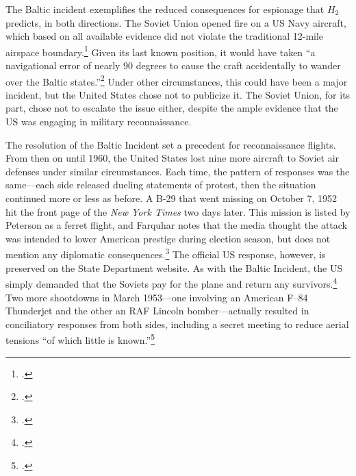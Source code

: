 \documentclass[14pt]{extarticle}
\begin{document}
The Baltic incident exemplifies the reduced consequences for espionage that $H_2$ predicts, in both directions. The Soviet Union opened fire on a US Navy aircraft, which based on all available evidence did not violate the traditional 12-mile airspace boundary.\footcite[p.~7. To be extra specific]{peterson_maybe_1993} Given its last known position, it would have taken ``a navigational error of nearly 90 degrees to cause the craft accidentally to wander over the Baltic states.''\footcite{the_new_york_times_soviet_1950} Under other circumstances, this could have been a major incident, but the United States chose not to publicize it. The Soviet Union, for its part, chose not to escalate the issue either, despite the ample evidence that the US was engaging in military reconnaissance.

The resolution of the Baltic Incident set a precedent for reconnaissance flights. From then on until 1960, the United States lost nine more aircraft to Soviet air defenses under similar circumstances. Each time, the pattern of responses was the same---each side released dueling statements of protest, then the situation continued more or less as before. A B-29 that went missing on October 7, 1952 hit the front page of the \emph{New York Times} two days later. This mission is listed by Peterson as a ferret flight, and Farquhar notes that the media thought the attack was intended to lower American prestige during election season, but does not mention any diplomatic consequences.\footcite[p.~43-44]{farquhar_aerial_2015} The official US response, however, is preserved on the State Department website. As with the Baltic Incident, the US simply demanded that the Soviets pay for the plane and return any survivors.\footcite{the_new_york_times_u.s._1952} Two more shootdowns in March 1953---one involving an American F–84 Thunderjet and the other an RAF Lincoln bomber---actually resulted in conciliatory responses from both sides, including a secret meeting to reduce aerial tensions \enquote{of which little is known.}\footcite[p.~45]{farquhar_aerial_2015}
\end{document}
